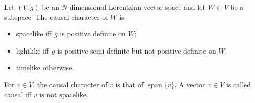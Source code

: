 Let $(V, g)$ be an $N$-dimensional Lorentzian vector space and let $W \subset V$ be a subspace. The causal character of $W$ is:
\begin{itemize}
  \item[(a)] spacelike iff $g$ is positive definite on $W$;
  \item[(b)] lightlike iff $g$ is positive semi-definite but not positive definite on $W$;
  \item[(c)] timelike otherwise.
\end{itemize}
For $v \in V$, the causal character of $v$ is that of $\operatorname{span}\{v\}$. A vector $v \in V$ is called causal iff $v$ is not spacelike.
